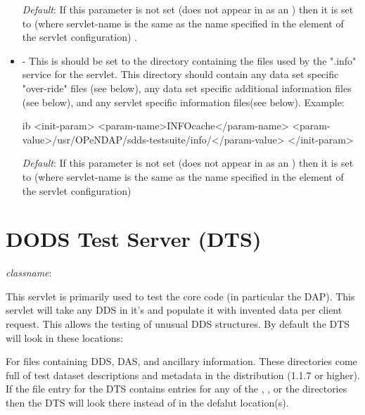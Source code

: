 \documentclass{dods-book}
\begin{document}
\begin{itemize}
\emph{Default}: If this parameter is not set (does not appear in as an ) 
then it is set to  
(where servlet-name is the same as the name specified in the  
element of the servlet configuration) .

\item {} - This is should be set to the directory containing the files used 
by the ".info" service for the servlet. This directory should contain any data set specific 
"over-ride" files (see below), any data set specific additional information files (see below), 
and any servlet specific information files(see below). 
Example:
\begin{vcode}{ib}
    <init-param>
        <param-name>INFOcache</param-name>
        <param-value>/usr/OPeNDAP/sdds-testsuite/info/</param-value>
    </init-param>
\end{vcode}

\emph{Default}: If this parameter is not set (does not appear in as an ) 
then it is set to  
(where servlet-name is the same as the name specified in the  element 
of the servlet configuration) 


\end{itemize}



\section{DODS Test Server (DTS)}

\emph{classname}: 

This servlet is primarily used to test the core code (in particular the DAP). This servlet 
will take any DDS in it's  and populate it with invented data per client 
request. This allows the testing of unusual DDS structures. By default the DTS will 
look in these locations:


For files containing DDS, DAS, and ancillary information. These directories come full 
of test dataset descriptions and metadata in the distribution (1.1.7 or higher). If the 
 file entry for the DTS contains entries for any of the , 
, or the  directories then the DTS will look there 
instead of in the defalut location(s).
\end{document}
